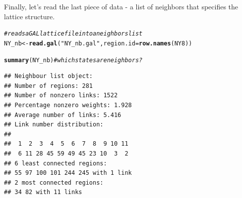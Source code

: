 \documentclass{article}\usepackage[]{graphicx}\usepackage[]{color}
\makeatletter
\newcommand{\hlstr}[1]{\textcolor[rgb]{0.192,0.494,0.8}{#1}}%
\newcommand{\hlcom}[1]{\textcolor[rgb]{0.678,0.584,0.686}{\textit{#1}}}%
\newcommand{\hlstd}[1]{\textcolor[rgb]{0.345,0.345,0.345}{#1}}%
\newcommand{\hlkwb}[1]{\textcolor[rgb]{0.69,0.353,0.396}{#1}}%
\newcommand{\hlkwc}[1]{\textcolor[rgb]{0.333,0.667,0.333}{#1}}%
\newcommand{\hlkwd}[1]{\textcolor[rgb]{0.737,0.353,0.396}{\textbf{#1}}}%
\newenvironment{kframe}{%
 \def\at@end@of@kframe{}%
 \ifinner\ifhmode%
  \def\at@end@of@kframe{\end{minipage}}%
  \begin{minipage}{\columnwidth}%
 \fi\fi%
 \def\FrameCommand##1{\hskip\@totalleftmargin \hskip-\fboxsep
 \colorbox{shadecolor}{##1}\hskip-\fboxsep
     \hskip-\linewidth \hskip-\@totalleftmargin \hskip\columnwidth}%
 \MakeFramed {\advance\hsize-\width
   \@totalleftmargin\z@ \linewidth\hsize
   \@setminipage}}%
 {\par\unskip\endMakeFramed%
 \at@end@of@kframe}
\newenvironment{knitrout}{}{} %
\makeatother
\begin{document}
Finally, let's read the last piece of data - a list of neighbors that specifies the lattice structure.

\begin{knitrout}
\color{fgcolor}\begin{kframe}
\begin{alltt}
\hlcom{# reads a GAL lattice file into a neighbors list }
\hlstd{NY_nb} \hlkwb{<-} \hlkwd{read.gal}\hlstd{(}\hlstr{"NY_nb.gal"}\hlstd{,} \hlkwc{region.id}\hlstd{=}\hlkwd{row.names}\hlstd{(NY8))}

\hlkwd{summary}\hlstd{(NY_nb)} \hlcom{#which states are neighbors?}
\end{alltt}
\begin{verbatim}
## Neighbour list object:
## Number of regions: 281 
## Number of nonzero links: 1522 
## Percentage nonzero weights: 1.928 
## Average number of links: 5.416 
## Link number distribution:
## 
##  1  2  3  4  5  6  7  8  9 10 11 
##  6 11 28 45 59 49 45 23 10  3  2 
## 6 least connected regions:
## 55 97 100 101 244 245 with 1 link
## 2 most connected regions:
## 34 82 with 11 links
\end{verbatim}
\end{kframe}
\end{knitrout}
\end{document}
